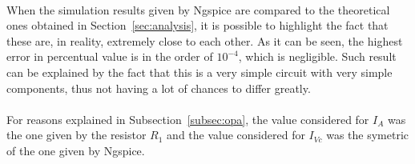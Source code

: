 \paragraph{} When the simulation results given by Ngspice are compared to the theoretical ones obtained in  Section~\ref{sec:analysis}, it is possible to highlight the fact that these are, in reality, extremely close to each other. As it can be seen, the highest error in percentual value is in the order of $10^{-4}$, which is negligible. Such result can be explained by the fact that this is a very simple circuit with very simple components, thus not having a lot of chances to differ greatly.

\paragraph{}For reasons explained in Subsection~\ref{subsec:opa}, the value considered for $I_A$ was the one given by the resistor $R_1$ and the value considered for $I_{Vc}$ was the symetric of the one given by Ngspice.


